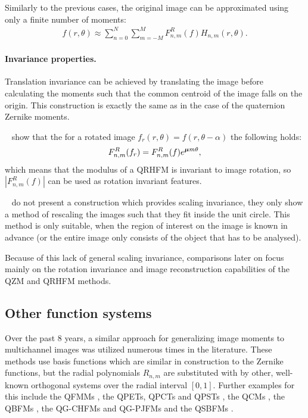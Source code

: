 Similarly to the previous cases, the original image can be approximated using only a finite number of moments: 
\begin{gather*}
      f(r,\theta) \approx \sum_{n=0}^{N}\sum_{m=-M}^{M}F_{n,m}^R(f)H_{n,m}(r,\theta).
\end{gather*}

\paragraph{Invariance properties.}
Translation invariance can be achieved by translating the image before calculating the moments such that the common centroid of the image falls on the origin. This construction is exactly the same as in the case of the quaternion Zernike moments.


\citeauthor{LiuAcc}~\cite{LiuAcc} show that the for a rotated image $f_r(r, \theta) = f(r, \theta - \alpha)$ the following holds:
\begin{gather*}
    F_{n,m}^R(f_r) = F_{n,m}^R(f) e^{\boldsymbol{\mu} m \theta},
\end{gather*}
which means that the modulus of a QRHFM is invariant to image rotation, so $|F_{n,m}^R(f)|$ can be used as rotation invariant features.


\citeauthor{LiuAcc}~\cite{LiuAcc} do not present a construction which provides scaling invariance, they only show a method of rescaling the images such that they fit inside the unit circle. This method is only suitable, when the region of interest on the image is known in advance (or the entire image only consists of the object that has to be analysed). 

Because of this lack of general scaling invariance, comparisons later on focus mainly on the rotation invariance and image reconstruction capabilities of the QZM and QRHFM methods.


\subsection{Other function systems}
Over the past 8 years, a similar approach for generalizing image moments to multichannel images was utilized numerous times in the literature. These methods use basis functions which are similar in construction to the Zernike functions, but the radial polynomials $R_{n,m}$ are substituted with by other, well-known orthogonal systems over the radial interval $[0,1]$. Further examples for this include the QFMMs \cite{qfmm}, the QPETs, QPCTs and QPSTs \cite{Li}, the QCMs \cite{Guo}, the QBFMs \cite{Shao}, the QG-CHFMs and QG-PJFMs \cite{Singh} and the QSBFMs \cite{Yang}.



